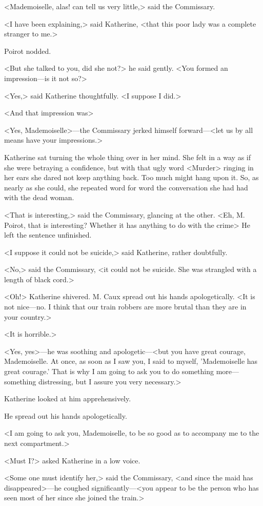 <Mademoiselle, alas! can tell us very little,> said the Commissary.

<I have been explaining,> said Katherine, <that this poor lady was a complete stranger to me.>

Poirot nodded.

<But she talked to you, did she not?> he said gently. <You formed an impression—is it not so?>

<Yes,> said Katherine thoughtfully. <I suppose I did.>

<And that impression was\longdash>

<Yes, Mademoiselle>—the Commissary jerked himself forward—<let us by all means have your impressions.>

Katherine sat turning the whole thing over in her mind. She felt in a way as if she were betraying a confidence, but with that ugly word <Murder> ringing in her ears she dared not keep anything back. Too much might hang upon it. So, as nearly as she could, she repeated word for word the conversation she had had with the dead woman.

<That is interesting,> said the Commissary, glancing at the other. <Eh, M. Poirot, that is interesting? Whether it has anything to do with the crime\longdash> He left the sentence unfinished.

<I suppose it could not be suicide,> said Katherine, rather doubtfully.

<No,> said the Commissary, <it could not be suicide. She was strangled with a length of black cord.>

<Oh!> Katherine shivered. M. Caux spread out his hands apologetically. <It is not nice—no. I think that our train robbers are more brutal than they are in your country.>

<It is horrible.>

<Yes, yes>—he was soothing and apologetic—<but you have great courage, Mademoiselle. At once, as soon as I saw you, I said to myself, 'Mademoiselle has great courage.' That is why I am going to ask you to do something more—something distressing, but I assure you very necessary.>

Katherine looked at him apprehensively.

He spread out his hands apologetically.

<I am going to ask you, Mademoiselle, to be so good as to accompany me to the next compartment.>

<Must I?> asked Katherine in a low voice.

<Some one must identify her,> said the Commissary, <and since the maid has disappeared>—he coughed significantly—<you appear to be the person who has seen most of her since she joined the train.>

